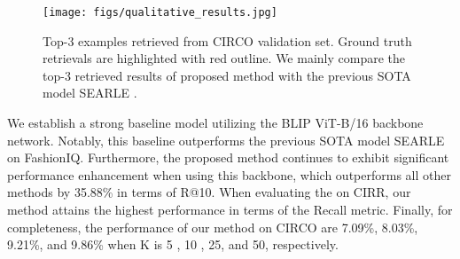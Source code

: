 \documentclass[10pt,twocolumn,letterpaper]{article}
\begin{document}
\begin{table}[!ht]
 \centering
 \Huge
  \caption{Quantitative results on CIRR test set. The best and second-best scores are highlighted in bold and underlined, respectively.}
  \label{tab:cirr_test_blip}
\end{table}


\begin{figure*}
    \centering
    \texttt{[image: figs/qualitative\_results.jpg]}
    \caption{Top-3 examples retrieved from CIRCO validation set. Ground truth retrievals are highlighted with red outline. We mainly compare the top-3 retrieved results of proposed method with the previous SOTA model SEARLE \cite{Baldrati_2023_ICCV}.}
    \label{fig:qualitative}
\end{figure*}


We establish a strong baseline model utilizing the BLIP ViT-B/16 backbone network. Notably, this baseline outperforms the previous SOTA model SEARLE on FashionIQ. Furthermore, the proposed method continues to exhibit significant performance enhancement when using this backbone, which outperforms all other methods by 35.88\% in terms of R@10. When evaluating the on CIRR, our method attains the highest performance in terms of the Recall metric. Finally, for completeness,  the performance of our method on CIRCO are 7.09\%, 8.03\%, 9.21\%, and 9.86\% when K is 5 , 10 , 25, and 50, respectively.
\end{document}
